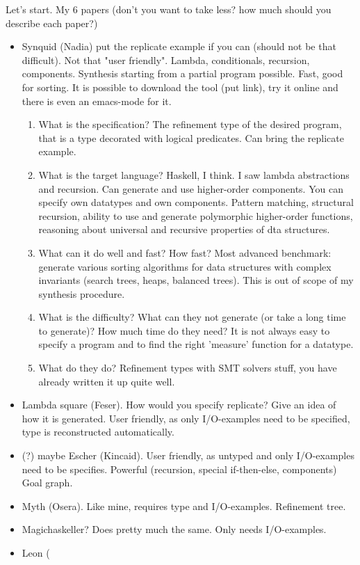 Let's start. My 6 papers (don't you want to take less? how much should you describe each paper?)
\begin{itemize}
\item Synquid (Nadia) put the replicate example if you can (should not be that difficult). Not that "user friendly". Lambda, conditionals, recursion, components. Synthesis starting from a partial program possible. Fast, good for sorting. It is possible to download the tool (put link), try it online and there is even an emacs-mode for it.
\begin{enumerate}
\item What is the specification?
The refinement type of the desired program, that is a type decorated with logical predicates. Can bring the replicate example.
\item What is the target language?
Haskell, I think. I saw lambda abstractions and recursion. Can generate and use higher-order components. You can specify own datatypes and own components.
Pattern matching, structural recursion, ability to use and generate polymorphic higher-order functions, reasoning about universal and recursive properties of dta structures.
\item What can it do well and fast? How fast?
Most advanced benchmark: generate various sorting algorithms for data structures with complex invariants (search trees, heaps, balanced trees). This is out of scope of my synthesis procedure.
\item What is the difficulty? What can they not generate (or take a long time to generate)? How much time do they need?
It is not always easy to specify a program and to find the right 'measure' function for a datatype.
\item What do they do?
Refinement types with SMT solvers stuff, you have already written it up quite well.
\end{enumerate}
\item Lambda square (Feser). How would you specify replicate? Give an idea of how it is generated. User friendly, as only I/O-examples need to be specified, type is reconstructed automatically.
\item (?) maybe Escher (Kincaid). User friendly, as untyped and only I/O-examples need to be specifies. Powerful (recursion, special if-then-else, components) Goal graph.
\item Myth (Osera). Like mine, requires type and I/O-examples. Refinement tree.
\item Magichaskeller? Does pretty much the same. Only needs I/O-examples.
\item Leon (
\end{itemize}

